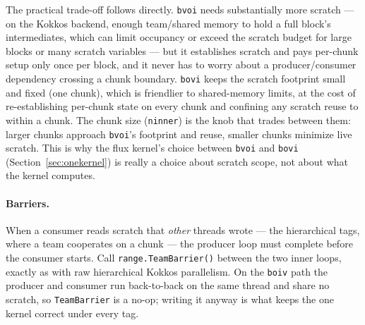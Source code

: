 \documentclass[11pt]{article}
\newcommand{\code}[1]{\lstinline[basicstyle=\ttfamily]|#1|}
\begin{document}
The practical trade-off follows directly. \code{bvoi} needs substantially more
scratch --- on the Kokkos backend, enough team/shared memory to hold a full block's
intermediates, which can limit occupancy or exceed the scratch budget for large
blocks or many scratch variables --- but it establishes scratch and pays
per-chunk setup only once per block, and it never has to worry about a
producer/consumer dependency crossing a chunk boundary. \code{bovi} keeps the
scratch footprint small and fixed (one chunk), which is friendlier to shared-memory
limits, at the cost of re-establishing per-chunk state on every chunk and confining
any scratch reuse to within a chunk. The chunk size (\code{ninner}) is the knob
that trades between them: larger chunks approach \code{bvoi}'s footprint and reuse,
smaller chunks minimize live scratch. This is why the flux kernel's choice between
\code{bvoi} and \code{bovi} (Section~\ref{sec:onekernel}) is really a choice about
scratch scope, not about what the kernel computes.

\paragraph{Barriers.} When a consumer reads scratch that \emph{other} threads
wrote --- the hierarchical tags, where a team cooperates on a chunk --- the
producer loop must complete before the consumer starts. Call
\code{range.TeamBarrier()} between the two inner loops, exactly as with raw
hierarchical Kokkos parallelism. On the \code{boiv} path the producer and consumer
run back-to-back on the same thread and share no scratch, so \code{TeamBarrier} is
a no-op; writing it anyway is what keeps the one kernel correct under every tag.
\end{document}
